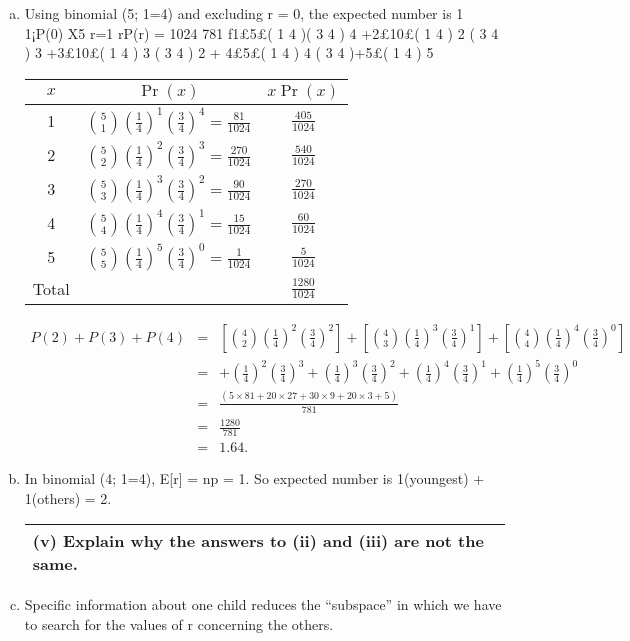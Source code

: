 \documentclass[a4paper,12pt]{article}
\begin{document}
\begin{enumerate}[(a)]
\item  Using binomial (5; 1=4) and excluding r = 0, the expected number is
1
1¡P(0)
X5
r=1
rP(r) =
1024
781
f1£5£(
1
4
)(
3
4
)
4
+2£10£(
1
4
)
2
(
3
4
)
3
+3£10£(
1
4
)
3
(
3
4
)
2
+
4£5£(
1
4
)
4
(
3
4
)+5£(
1
4
)
5
{
\large
\begin{center}
\begin{tabular}{|c|c|c|} \hline
$x$ & $\Pr(x)$ & $x \Pr(x)$\\ \hline
1&  $ {5 \choose 1}  \left( \frac{1}{4} \right) ^1  \left(\frac{3}{4}\right)^{4} = \frac{81}{1024}$&  $\frac{405}{1024}$ \\\hline
2&  ${5 \choose 2}\left( \frac{1}{4} \right) ^2  \left(\frac{3}{4}\right)^{3} = \frac{270}{1024}$&  $\frac{540}{1024}$ \\\hline
3&  ${5 \choose 3}\left( \frac{1}{4} \right) ^3  \left(\frac{3}{4}\right)^{2} = \frac{90}{1024}$&  $\frac{270}{1024}$ \\\hline
4&  ${5 \choose 4}\left( \frac{1}{4} \right) ^4  \left(\frac{3}{4}\right)^{1}= \frac{15}{1024}$&  $\frac{60}{1024}$\\ \hline
5& ${5 \choose 5}\left( \frac{1}{4} \right) ^5  \left(\frac{3}{4}\right)^{0} = \frac{1}{1024}$&  $\frac{5}{1024}$ \\\hline
Total & & $\frac{1280}{1024}$\\ \hline
\end{tabular}
\end{center}
}

\begin{eqnarray*} 
P(2)+P(3)+P(4) &=& 
\left[ { 4 \choose 2}
\left( \frac{1}{4} \right) ^2 \left(\frac{3}{4}\right)^2 \right]+ 
\left[ { 4 \choose 3}
\left( \frac{1}{4} \right) ^3  \left(\frac{3}{4}\right)^1 \right]
+\left[ { 4 \choose 4}
\left( \frac{1}{4} \right) ^4  \left(\frac{3}{4}\right)^{0} \right]
\\  &=& 
+ \left( \frac{1}{4} \right) ^2  \left(\frac{3}{4}\right)^{3}
+ \left( \frac{1}{4} \right) ^3  \left(\frac{3}{4}\right)^{2}
+ \left( \frac{1}{4} \right) ^4  \left(\frac{3}{4}\right)^{1}
+ \left( \frac{1}{4} \right) ^5  \left(\frac{3}{4}\right)^{0} 
\\ &=&  \frac{(5\times 81+20\times 27+30\times 9+20\times 3+5)}{781}    \\
 &=& \frac{1280}{781} \\
 &=& 1.64.
\end{eqnarray*}

\item In binomial (4; 1=4), E[r] = np = 1.
So expected number is 1(youngest) + 1(others) = 2.
\newpage
  \begin{table}[ht!]
     \centering
     \begin{tabular}{|p{15cm}|}
     \hline     
(v) Explain why the answers to (ii) and (iii) are not the same.\\ \hline
      \end{tabular}
    \end{table}
\item Specific information about one child reduces the “subspace” in which we
have to search for the values of r concerning the others.
\end{enumerate}
\end{document}
